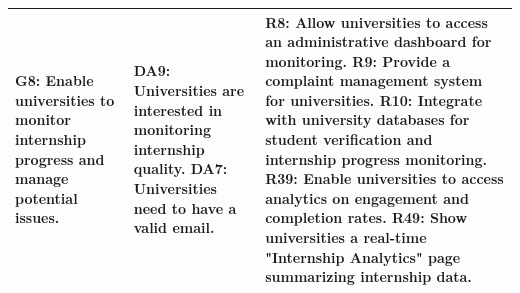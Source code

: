 \begin{longtable}{| p{} | p{} | p{} |}
G8: Enable universities to monitor internship progress and manage potential issues. & DA9: Universities are interested in monitoring internship quality. \newline DA7: Universities need to have a valid email. & R8: Allow universities to access an administrative dashboard for monitoring. \newline R9: Provide a complaint management system for universities. \newline R10: Integrate with university databases for student verification and internship progress monitoring. \newline R39: Enable universities to access analytics on engagement and completion rates. \newline R49: Show universities a real-time "Internship Analytics" page summarizing internship data. \\ \hline
\end{longtable}



